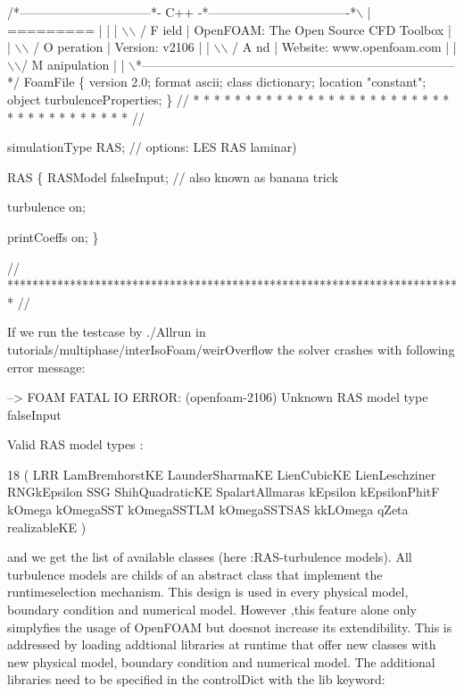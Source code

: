 \begin{DoxyCode}
/*--------------------------------*- C++ -*----------------------------------*\(\backslash\)
| =========                 |                                                 |
| \(\backslash\)\(\backslash\)      /  F ield         | OpenFOAM: The Open Source CFD Toolbox           |
|  \(\backslash\)\(\backslash\)    /   O peration     | Version:  v2106                                 |
|   \(\backslash\)\(\backslash\)  /    A nd           | Website:  www.openfoam.com                      |
|    \(\backslash\)\(\backslash\)/     M anipulation  |                                                 |
\(\backslash\)*---------------------------------------------------------------------------*/
FoamFile
\{
    version     2.0;
    format      ascii;
    class       dictionary;
    location    "constant";
    object      turbulenceProperties;
\}
// * * * * * * * * * * * * * * * * * * * * * * * * * * * * * * * * * * * * * //

simulationType  RAS; // options: LES RAS laminar)

RAS
\{
    RASModel        falseInput; // also known as banana trick

    turbulence      on;

    printCoeffs     on;
\}


// ************************************************************************* //
\end{DoxyCode}


If we run the testcase by {\ttfamily ./\+Allrun} in tutorials/multiphase/inter\+Iso\+Foam/weir\+Overflow the solver crashes with following error message\+:


\begin{DoxyCode}
--> FOAM FATAL IO ERROR: (openfoam-2106)
Unknown RAS model type falseInput

Valid RAS model types :

18
(
LRR
LamBremhorstKE
LaunderSharmaKE
LienCubicKE
LienLeschziner
RNGkEpsilon
SSG
ShihQuadraticKE
SpalartAllmaras
kEpsilon
kEpsilonPhitF
kOmega
kOmegaSST
kOmegaSSTLM
kOmegaSSTSAS
kkLOmega
qZeta
realizableKE
)
\end{DoxyCode}


and we get the list of available classes (here \+:R\+A\+S-\/turbulence models). All turbulence models are childs of an abstract class that implement the runtimeselection mechanism. This design is used in every physical model, boundary condition and numerical model. However ,this feature alone only simplyfies the usage of Open\+F\+O\+AM but doesnot increase its extendibility. This is addressed by loading addtional libraries at runtime that offer new classes with new physical model, boundary condition and numerical model. The additional libraries need to be specified in the control\+Dict with the lib keyword\+:


